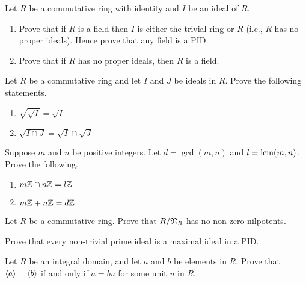 \begin{problem}\label{problem-ring-is-field-iff-no-proper-ideals}
    Let $R$ be a commutative ring with identity and $I$ be an ideal of $R$.
    \begin{enumerate}[label=(\alph*)]
        \item Prove that if $R$ is a field then $I$ is either the trivial ring or $R$ (i.e., $R$ has no proper ideals). Hence prove that any field is a PID.
        \item Prove that if $R$ has no proper ideals, then $R$ is a field.
    \end{enumerate}
\end{problem}

\begin{problem}
    Let $R$ be a commutative ring and let $I$ and $J$ be ideals in $R$. Prove the following statements.
    \begin{enumerate}[label=(\alph*)]
        \item $\sqrt{\sqrt{I}} = \sqrt{I}$
        \item $\sqrt{I \cap J} = \sqrt{I} \cap \sqrt{J}$
    \end{enumerate}
\end{problem}

\begin{problem}
    Suppose $m$ and $n$ be positive integers. Let $d = \gcd(m,n)$ and $l = \mathrm{lcm}(m,n)$. Prove the following.
    \begin{enumerate}[label=(\alph*)]
        \item $m\mathbb{Z} \cap n\mathbb{Z} = l\mathbb{Z}$
        \item $m\mathbb{Z} + n\mathbb{Z} = d\mathbb{Z}$
    \end{enumerate}
\end{problem}

\begin{problem}
    Let $R$ be a commutative ring. Prove that $R / \mathfrak{N}_{R}$ has no non-zero nilpotents.
\end{problem}

\begin{problem}
    Prove that every non-trivial prime ideal is a maximal ideal in a PID.
\end{problem}

\begin{problem}
    Let $R$ be an integral domain, and let $a$ and $b$ be elements in $R$. Prove that $\left\langle a\right\rangle = \left\langle b\right\rangle$ if and only if $a = bu$ for some unit $u$ in $R$.
\end{problem}

